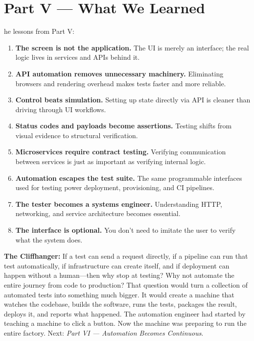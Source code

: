\documentclass[11pt, a4paper, openany]{book}
\newcommand{\initialcap}[1]{{\fontfamily{lmss}\selectfont\huge\textbf{#1}}}
\begin{document}
\chapter*{Part V --- What We Learned}

\noindent \initialcap{T}he lessons from Part V:
\begin{enumerate}
    \item \textbf{The screen is not the application.} The UI is merely an interface; the real logic lives in services and APIs behind it.
    \item \textbf{API automation removes unnecessary machinery.} Eliminating browsers and rendering overhead makes tests faster and more reliable.
    \item \textbf{Control beats simulation.} Setting up state directly via API is cleaner than driving through UI workflows.
    \item \textbf{Status codes and payloads become assertions.} Testing shifts from visual evidence to structural verification.
    \item \textbf{Microservices require contract testing.} Verifying communication between services is just as important as verifying internal logic.
    \item \textbf{Automation escapes the test suite.} The same programmable interfaces used for testing power deployment, provisioning, and CI pipelines.
    \item \textbf{The tester becomes a systems engineer.} Understanding HTTP, networking, and service architecture becomes essential.
    \item \textbf{The interface is optional.} You don't need to imitate the user to verify what the system does.
\end{enumerate}

\noindent \textbf{The Cliffhanger:} If a test can send a request directly, if a pipeline can run that test automatically, if infrastructure can create itself, and if deployment can happen without a human---then why stop at testing? Why not automate the entire journey from code to production? That question would turn a collection of automated tests into something much bigger. It would create a machine that watches the codebase, builds the software, runs the tests, packages the result, deploys it, and reports what happened. The automation engineer had started by teaching a machine to click a button. Now the machine was preparing to run the entire factory. Next: \textit{Part VI --- Automation Becomes Continuous}.
\end{document}
